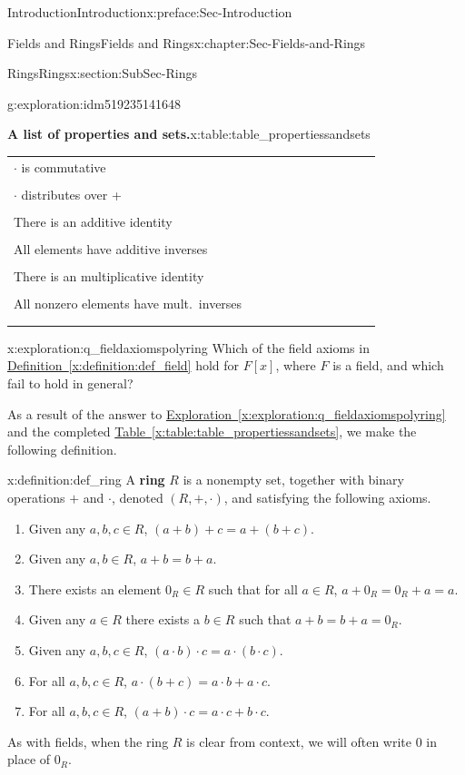 \documentclass[oneside,10pt,]{book}
\newcommand{\xreffont}{\relax}
\newcommand{\terminology}[1]{\textbf{#1}}
\numberwithin{equation}{section}
\newcommand{\hrulethin}  {\noalign{\hrule height 0.04em}}
\begin{document}
\begin{preface}{Introduction}{}{Introduction}{}{}{x:preface:Sec-Introduction}
\begin{chapterptx}{Fields and Rings}{}{Fields and Rings}{}{}{x:chapter:Sec-Fields-and-Rings}
\begin{sectionptx}{Rings}{}{Rings}{}{}{x:section:SubSec-Rings}
\begin{exploration}{}{g:exploration:idm519235141648}
\begin{tableptx}{\textbf{A list of properties and sets.}}{x:table:table_propertiessandsets}{}
{{\begin{tabular}{lllllllllll}
\(\cdot\) is commutative&&&&&&&&&&\tabularnewline[0pt]
&&&&&&&&&&\tabularnewline\hrulethin
\(\cdot\) distributes over +&&&&&&&&&&\tabularnewline[0pt]
&&&&&&&&&&\tabularnewline\hrulethin
There is an additive identity&&&&&&&&&&\tabularnewline[0pt]
&&&&&&&&&&\tabularnewline\hrulethin
All elements have additive inverses&&&&&&&&&&\tabularnewline[0pt]
&&&&&&&&&&\tabularnewline\hrulethin
There is an multiplicative identity&&&&&&&&&&\tabularnewline[0pt]
&&&&&&&&&&\tabularnewline\hrulethin
All nonzero elements have mult.~inverses&&&&&&&&&&\tabularnewline[0pt]
&&&&&&&&&&\tabularnewline\hrulethin
\end{tabular}}
}%
\end{tableptx}%
\end{exploration}
\begin{exploration}{}{x:exploration:q_fieldaxiomspolyring}%
Which of the field axioms in \hyperref[x:definition:def_field]{Definition~{\xreffont\ref{x:definition:def_field}}} hold for \(F[x]\), where \(F\) is a field, and which fail to hold in general?%
\end{exploration}
As a result of the answer to \hyperref[x:exploration:q_fieldaxiomspolyring]{Exploration~{\xreffont\ref{x:exploration:q_fieldaxiomspolyring}}} and the completed \hyperref[x:table:table_propertiessandsets]{Table~{\xreffont\ref{x:table:table_propertiessandsets}}}, we make the following definition.%
\begin{definition}{}{x:definition:def_ring}%
%
A \terminology{ring} \(R\) is a nonempty set, together with binary operations \(+\) and \(\cdot\), denoted \((R,+,\cdot)\), and satisfying the following axioms.%
\begin{enumerate}
\item{}Given any \(a,b,c\in R\), \((a+b)+c = a+(b+c)\).%
\item{}Given any \(a,b\in R\), \(a+b= b+a\).%
\item{}There exists an element \(0_R\in R\) such that for all \(a\in R\), \(a+0_R = 0_R + a = a\).%
\item{}Given any \(a\in R\) there exists a \(b\in R\) such that \(a+b = b + a =0_R\).%
\item{}Given any \(a,b,c\in R\), \((a\cdot b)\cdot c = a\cdot (b\cdot c)\).%
\item{}For all \(a,b,c\in R\), \(a\cdot (b+c) = a\cdot b + a\cdot c\).%
\item{}For all \(a,b,c\in R\), \((a+b)\cdot c = a\cdot c + b\cdot c\).%
\end{enumerate}
As with fields, when the ring \(R\) is clear from context, we will often write \(0\) in place of \(0_R\).%

\end{definition}
\end{sectionptx}
\end{chapterptx}
\end{preface}
\end{document}

